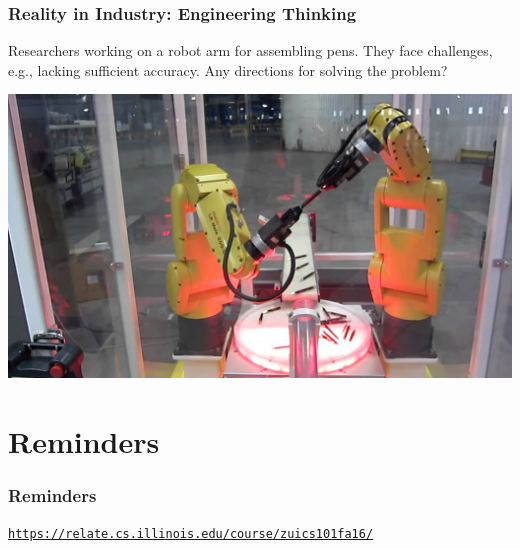 \documentclass[11pt]{beamer}
\begin{document}
\begin{frame}
	\frametitle{Reality in Industry: Engineering  Thinking}
	\Enlarge
	\begin{itemize} 
		\myitem Researchers working on a robot arm for assembling pens.
		\myitem They face challenges, e.g., lacking sufficient accuracy.
		\myitem Any directions for solving the problem?
	
	\end{itemize}
	 \includegraphics[width=\textwidth]{./img/robotarm.jpg}
\end{frame}


\section{Reminders}

\begin{frame}
  \frametitle{Reminders}
  \Enlarge

  \begin{center}
    \textcolor{\CSBase}{\small \texttt{\url{https://relate.cs.illinois.edu/course/zuics101fa16/}}}
  \end{center}
\end{frame}
\end{document}
